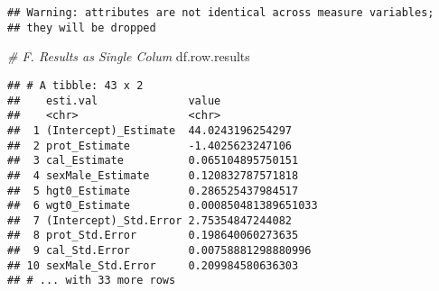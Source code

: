 \documentclass[
]{book}
\newenvironment{Shaded}{\begin{snugshade}}{\end{snugshade}}
\newcommand{\CommentTok}[1]{\textcolor[rgb]{0.56,0.35,0.01}{\textit{#1}}}
\newcommand{\DataTypeTok}[1]{\textcolor[rgb]{0.13,0.29,0.53}{#1}}
\newcommand{\KeywordTok}[1]{\textcolor[rgb]{0.13,0.29,0.53}{\textbf{#1}}}
\newcommand{\NormalTok}[1]{#1}
\newcommand{\OperatorTok}[1]{\textcolor[rgb]{0.81,0.36,0.00}{\textbf{#1}}}
\newcommand{\StringTok}[1]{\textcolor[rgb]{0.31,0.60,0.02}{#1}}
\begin{document}
\begin{Shaded}
\end{Shaded}

\begin{verbatim}
## Warning: attributes are not identical across measure variables;
## they will be dropped
\end{verbatim}

\begin{Shaded}
\begin{Highlighting}[]
\CommentTok{# F. Results as Single Colum}
\NormalTok{df.row.results}
\end{Highlighting}
\end{Shaded}

\begin{verbatim}
## # A tibble: 43 x 2
##    esti.val              value               
##    <chr>                 <chr>               
##  1 (Intercept)_Estimate  44.0243196254297    
##  2 prot_Estimate         -1.4025623247106    
##  3 cal_Estimate          0.065104895750151   
##  4 sexMale_Estimate      0.120832787571818   
##  5 hgt0_Estimate         0.286525437984517   
##  6 wgt0_Estimate         0.000850481389651033
##  7 (Intercept)_Std.Error 2.75354847244082    
##  8 prot_Std.Error        0.198640060273635   
##  9 cal_Std.Error         0.00758881298880996 
## 10 sexMale_Std.Error     0.209984580636303   
## # ... with 33 more rows
\end{verbatim}
\end{document}
